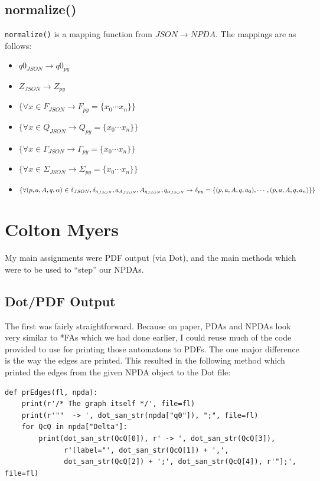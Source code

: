 \documentclass[a4paper]{article}
\begin{document}
\subsection{normalize()}
\texttt{normalize()} is a mapping function from $JSON\rightarrow NPDA$. The
mappings are as follows:
\begin{itemize}
    \item $q0_{JSON}\rightarrow q0_{py}$
    \item $Z_{JSON}\rightarrow Z_{py}$
    \item $\{\forall x\in F_{JSON} \rightarrow F_{py}=\{x_0\cdots x_n\}\}$
    \item $\{\forall x\in Q_{JSON} \rightarrow Q_{py}=\{x_0\cdots x_n\}\}$
    \item $\{\forall x\in\Gamma_{JSON} \rightarrow \Gamma_{py}=\{x_0\cdots x_n\}\}$
    \item $\{\forall x\in\Sigma_{JSON} \rightarrow \Sigma_{py}=\{x_0\cdots x_n\}\}$
    \item $\{\forall (p,a,A,q,\alpha)\in\delta_{JSON},\delta_{a_{JSON}},
                a_{A_{JSON}},
                A_{q_{JSON}},
                q_{\alpha_{JSON}} \rightarrow\\
                \delta_{py}=\{(p,a,A,q,a_0),\cdots,(p,a,A,q,a_n)\}\}$
\end{itemize}

\section{Colton Myers}

My main assignments were PDF output (via Dot), and the main methods which were
to be used to ``step'' our NPDAs.

\subsection{Dot/PDF Output}

The first was fairly straightforward.  Because on paper, PDAs and NPDAs look
very similar to *FAs which we had done earlier, I could reuse much of the code
provided to use for printing those automatons to PDFs.  The one major
difference is the way the edges are printed.  This resulted in the following
method which printed the edges from the given NPDA object to the Dot file:

\begin{verbatim}
def prEdges(fl, npda):
    print(r'/* The graph itself */', file=fl)
    print(r'""  -> ', dot_san_str(npda["q0"]), ";", file=fl)
    for QcQ in npda["Delta"]:
        print(dot_san_str(QcQ[0]), r' -> ', dot_san_str(QcQ[3]),
              r'[label="', dot_san_str(QcQ[1]) + ',',
              dot_san_str(QcQ[2]) + ';', dot_san_str(QcQ[4]), r'"];', file=fl)
\end{verbatim}
\end{document}

